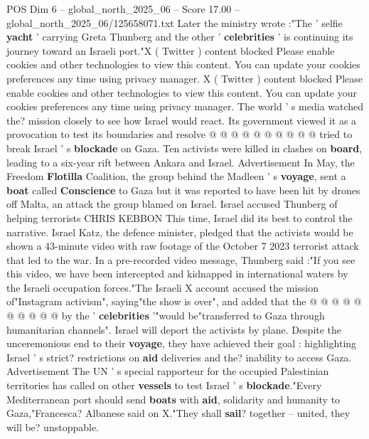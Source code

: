 \begin{textsample}{POS Dim 6 – global\_north\_2025\_06 – Score 17.00 – global\_north\_2025\_06/125658071.txt}
Later the ministry wrote :"The ' selfie \textbf{yacht} ' carrying Greta Thunberg and the other ' \textbf{celebrities} ' is continuing its journey toward an Israeli port."X ( Twitter ) content blocked Please enable cookies and other technologies to view this content.
You can update your cookies preferences any time using privacy manager.
X ( Twitter ) content blocked Please enable cookies and other technologies to view this content.
You can update your cookies preferences any time using privacy manager.
The world ' s media watched the? mission closely to see how Israel would react.
Its government viewed it as a provocation to test its boundaries and resolve @ @ @ @ @ @ @ @ @ @ tried to break Israel ' s \textbf{blockade} on Gaza.
Ten activists were killed in clashes on \textbf{board}, leading to a six-year rift between Ankara and Israel.
Advertisement In May, the Freedom \textbf{Flotilla} Coalition, the group behind the Madleen ' s \textbf{voyage}, sent a \textbf{boat} called \textbf{Conscience} to Gaza but it was reported to have been hit by drones off Malta, an attack the group blamed on Israel.
Israel accused Thunberg of helping terrorists CHRIS KEBBON This time, Israel did its best to control the narrative.
Israel Katz, the defence minister, pledged that the activists would be shown a 43-minute video with raw footage of the October 7 2023 terrorist attack that led to the war.
In a pre-recorded video message, Thunberg said :"If you see this video, we have been intercepted and kidnapped in international waters by the Israeli occupation forces."The Israeli X account accused the mission of"Instagram activism", saying"the show is over", and added that the @ @ @ @ @ @ @ @ @ @ by the ' \textbf{celebrities} '"would be"transferred to Gaza through humanitarian channels".
Israel will deport the activists by plane.
Despite the unceremonious end to their \textbf{voyage}, they have achieved their goal : highlighting Israel ' s strict? restrictions on \textbf{aid} deliveries and the? inability to access Gaza.
Advertisement The UN ' s special rapporteur for the occupied Palestinian territories has called on other \textbf{vessels} to test Israel ' s \textbf{blockade}."Every Mediterranean port should send \textbf{boats} with \textbf{aid}, solidarity and humanity to Gaza,"Francesca?
Albanese said on X."They shall \textbf{sail}? together -- united, they will be? unstoppable.

\end{textsample}
